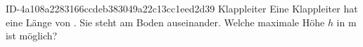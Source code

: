 \begin{exercise}
      {ID-4a108a2283166ccdeb383049a22c13cc1eed2d39}
      {Klappleiter}
  \ifproblem\problem
    Eine Klappleiter hat eine Länge von . Sie steht am Boden
     auseinander. Welche maximale Höhe $h$ in m ist möglich?
  \fi
\end{exercise}
